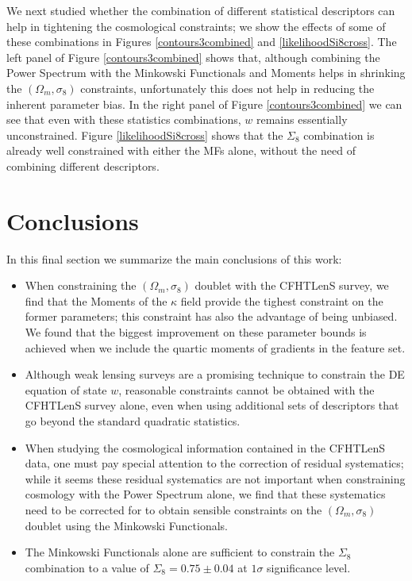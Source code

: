 \documentclass[reprint,aps,prd,superscriptaddress,showkeys,showpacs]{revtex4-1}
\begin{document}
We next studied whether the combination of different statistical descriptors can help in tightening the cosmological constraints; we show the effects of some of these combinations in Figures \ref{contours3combined} and \ref{likelihoodSi8cross}. The left panel of Figure \ref{contours3combined} shows that, although combining the Power Spectrum with the Minkowski Functionals and Moments helps in shrinking the $(\Omega_m,\sigma_8)$ constraints, unfortunately this does not help in reducing the inherent parameter bias. In the right panel of Figure \ref{contours3combined} we can see that even with these statistics combinations, $w$ remains essentially unconstrained. Figure \ref{likelihoodSi8cross} shows that the $\Sigma_8$ combination is already well constrained with either the MFs alone, without the need of combining different descriptors.   

\newpage 

\section{Conclusions}

In this final section we summarize the main conclusions of this work:
\begin{itemize}
\item When constraining the $(\Omega_m,\sigma_8)$ doublet with the CFHTLenS survey, we find that the Moments of the $\kappa$ field provide the tighest constraint on the former parameters; this constraint has also the advantage of being unbiased. We found that the biggest improvement on these parameter bounds is achieved when we include the quartic moments of gradients in the feature set. 
\item Although weak lensing surveys are a promising technique to constrain the DE equation of state $w$, reasonable constraints cannot be obtained with the CFHTLenS survey alone, even when using additional sets of descriptors that go beyond the standard quadratic statistics.
\item When studying the cosmological information contained in the CFHTLenS data, one must pay special attention to the correction of residual systematics; while it seems these residual systematics are not important when constraining cosmology with the Power Spectrum alone, we find that these systematics need to be corrected for to obtain sensible constraints on the $(\Omega_m,\sigma_8)$ doublet using the Minkowski Functionals. 
\item The Minkowski Functionals alone are sufficient to constrain the $\Sigma_8$ combination to a value of $\Sigma_8=0.75\pm0.04$ at $1\sigma$ significance level. 
\end{itemize}
\end{document}
